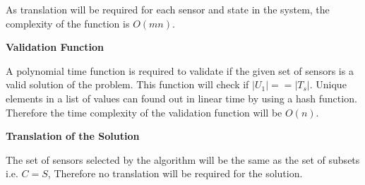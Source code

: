 As translation will be required for each sensor and state in the system, the complexity of the function is $O(mn)$.

\textbf{Validation Function}

A polynomial time function is required to validate if the given set of sensors is a valid solution of the problem. This function will check if $|U_1| == |T_s|$. Unique elements in a list of values can found out in linear time by using a hash function. Therefore the time complexity of the validation function will be $O(n)$.

\textbf{Translation of the Solution}

The set of sensors selected by the algorithm will be the same as the set of subsets i.e. $C = S$, Therefore no translation will be required for the solution.
